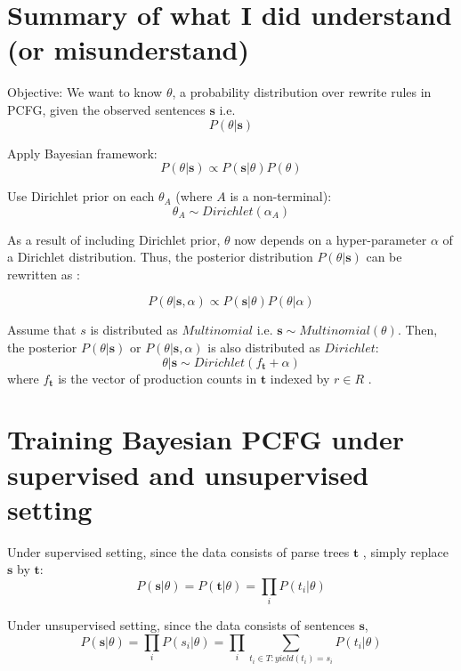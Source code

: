 \documentclass[11pt]{article}
\begin{document}
\section{Summary of what I did understand (or misunderstand)}
Objective: We want to know $\theta$, a probability distribution over rewrite rules in PCFG, given the observed sentences $\boldsymbol{s}$ i.e. 
$$
P(\theta|\boldsymbol{s})
$$


Apply Bayesian framework:
$$
P(\theta|\boldsymbol{s}) \propto P(\boldsymbol{s}|\theta) P(\theta)
$$

Use Dirichlet prior on each $\theta_A$ (where $A$ is a non-terminal):
$$
\theta_A \sim Dirichlet(\alpha_A) 
$$

As a result of including Dirichlet prior, $\theta$ now depends on a hyper-parameter $\alpha$ of a Dirichlet distribution. Thus, the posterior distribution $P(\theta|\boldsymbol{s})$ can be rewritten as \cite{cohen-johnson:2013:ACL2013}:

$$
P(\theta|\boldsymbol{s}, \alpha) \propto P(\boldsymbol{s}|\theta) P(\theta | \alpha)
$$


Assume that $s$ is distributed as $Multinomial$ i.e. $\boldsymbol{s} \sim Multinomial(\theta)$. Then, the posterior $P(\theta|\boldsymbol{s})$ or $P(\theta|\boldsymbol{s}, \alpha)$ is also distributed as $Dirichlet$:
$$
\theta|\boldsymbol{s} \sim Dirichlet(f_{\boldsymbol{t}} + \alpha)
$$
where $f_{\boldsymbol{t}}$ is the vector of production counts in $\boldsymbol{t}$ indexed by $r \in R$ \cite{johnson-griffiths-goldwater:2007:main}.

\section{Training Bayesian PCFG under supervised and unsupervised setting}

Under supervised setting, since the data consists of parse trees $\boldsymbol{t}$ \cite{cohen-johnson:2013:ACL2013}, simply replace $\boldsymbol{s}$ by $\boldsymbol{t}$:
$$
P(\boldsymbol{s}|\theta) =  P(\boldsymbol{t}|\theta) = \prod_i P(t_i | \theta)
$$

Under unsupervised setting, since the data consists of sentences $\boldsymbol{s}$,
$$
P(\boldsymbol{s}|\theta) = \prod_i P(s_i | \theta) = \prod_i \sum_{t_i \in T: yield(t_i) = s_i} P(t_i | \theta)
$$

\end{document}
